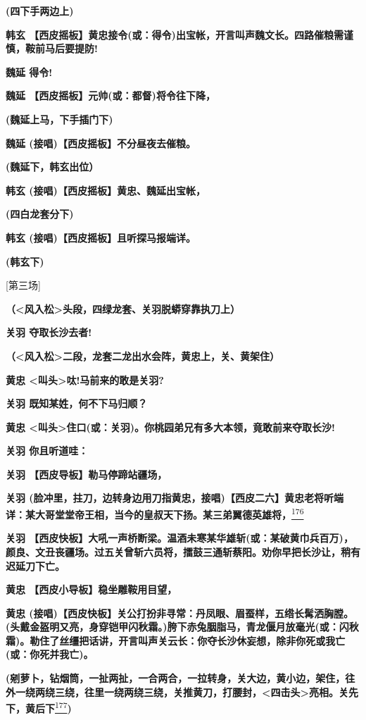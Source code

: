 \textbf{(四下手两边上)}

\textbf{韩玄
【西皮摇板】黄忠接令(或：得令)出宝帐，开言叫声魏文长。四路催粮需谨慎，鞍前马后要提防!}

\textbf{魏延 得令!}

\textbf{魏延 【西皮摇板】元帅(或：都督)将令往下降，}

\textbf{(魏延上马，下手插门下)}

\textbf{魏延 (接唱)【西皮摇板】不分昼夜去催粮。}

\textbf{(魏延下，韩玄出位）}

\textbf{韩玄 (接唱)【西皮摇板】黄忠、魏延出宝帐，}

\textbf{(四白龙套分下)}

\textbf{韩玄 (接唱)【西皮摇板】且听探马报端详。}

\textbf{(韩玄下)}

{[}第三场{]}

\textbf{（\textless{}风入松\textgreater{}头段，四绿龙套、关羽脱蟒穿靠执刀上）}

\textbf{关羽 夺取长沙去者!}

\textbf{（\textless{}风入松\textgreater{}二段，龙套二龙出水会阵，黄忠上，关、黄架住）}

\textbf{黄忠 \textless{}叫头\textgreater{}呔!马前来的敢是关羽?}

\textbf{关羽 既知某姓，何不下马归顺？}

\textbf{黄忠
\textless{}叫头\textgreater{}住口(或：关羽)。你桃园弟兄有多大本领，竟敢前来夺取长沙!}

\textbf{关羽 你且听道哇：}

\textbf{关羽 【西皮导板】勒马停蹄站疆场，}

\textbf{关羽
(脸冲里，拄刀，边转身边用刀指黄忠，接唱)【西皮二六】黄忠老将听端详：某大哥堂堂帝王相，当今的皇叔天下扬。某三弟翼德英雄将，}\protect\hyperlink{fn176}{\textsuperscript{176}}

\textbf{关羽
【西皮快板】大吼一声桥断梁。温酒未寒某华雄斩(或：某破黄巾兵百万)，颜良、文丑丧疆场。过五关曾斩六员将，擂鼓三通斩蔡阳。劝你早把长沙让，稍有迟延刀下亡。}

\textbf{黄忠 【西皮小导板】稳坐雕鞍用目望，}

\textbf{黄忠
(接唱)【西皮快板】关公打扮非寻常：丹凤眼、眉蚕样，五绺长髯洒胸膛。(头戴金盔明又亮，身穿铠甲闪秋霜。)胯下赤兔胭脂马，青龙偃月放毫光(或：闪秋霜)。勒住了丝缰把话讲，开言叫声关云长：你夺长沙休妄想，除非你死或我亡(或：你死并我亡)。}

\textbf{(剜萝卜，钻烟筒，一扯两扯，一合两合，一拉转身，关大边，黄小边，架住，往外一绕两绕三绕，往里一绕两绕三绕，关推黄刀，打腰封，\textless{}四击头\textgreater{}亮相。关先下，黄后下}\protect\hyperlink{fn177}{\textsuperscript{177}}\textbf{)}

